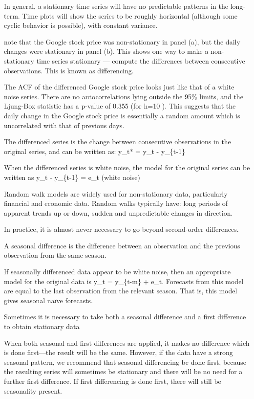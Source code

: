 \documentclass[]{book}
\begin{document}
In general, a stationary time series will have no predictable patterns
in the long-term. Time plots will show the series to be roughly
horizontal (although some cyclic behavior is possible), with constant
variance.

note that the Google stock price was non-stationary in panel (a), but
the daily changes were stationary in panel (b). This shows one way to
make a non-stationary time series stationary --- compute the differences
between consecutive observations. This is known as differencing.

The ACF of the differenced Google stock price looks just like that of a
white noise series. There are no autocorrelations lying outside the 95\%
limits, and the Ljung-Box statistic has a p-value of 0.355 (for h=10 ).
This suggests that the daily change in the Google stock price is
essentially a random amount which is uncorrelated with that of previous
days.

The differenced series is the change between consecutive observations in
the original series, and can be written as: y\_t* = y\_t - y\_\{t-1\}

When the differenced series is white noise, the model for the original
series can be written as y\_t - y\_\{t-1\} = e\_t (white noise)

Random walk models are widely used for non-stationary data, particularly
financial and economic data. Random walks typically have: long periods
of apparent trends up or down, sudden and unpredictable changes in
direction.

In practice, it is almost never necessary to go beyond second-order
differences.

A seasonal difference is the difference between an observation and the
previous observation from the same season.

If seasonally differenced data appear to be white noise, then an
appropriate model for the original data is y\_t = y\_\{t-m\} + e\_t.
Forecasts from this model are equal to the last observation from the
relevant season. That is, this model gives seasonal naïve forecasts.

Sometimes it is necessary to take both a seasonal difference and a first
difference to obtain stationary data

When both seasonal and first differences are applied, it makes no
difference which is done first---the result will be the same. However,
if the data have a strong seasonal pattern, we recommend that seasonal
differencing be done first, because the resulting series will sometimes
be stationary and there will be no need for a further first difference.
If first differencing is done first, there will still be seasonality
present.
\end{document}
